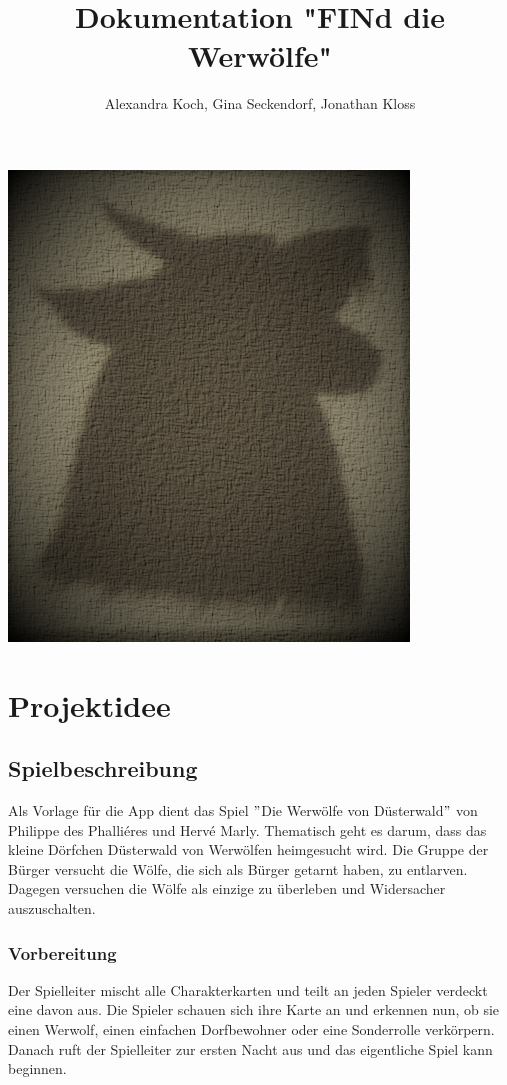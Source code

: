 \documentclass[12pt, a4paper]{article}
\title{Dokumentation "FINd die Werwölfe"}
\author{Alexandra Koch, Gina Seckendorf, Jonathan Kloss}
\begin{document}
\maketitle
\begin{center} \includegraphics{wolf} \end{center}
\newpage
\tableofcontents
\setcounter{tocdepth}{4}

\newpage
\section{Projektidee}

	\subsection{Spielbeschreibung}
Als Vorlage für die App dient das Spiel $"$Die Werwölfe von Düsterwald$"$ von Philippe des Phalliéres und Hervé Marly. Thematisch geht es darum, dass das kleine Dörfchen Düsterwald von Werwölfen heimgesucht wird. Die Gruppe der Bürger versucht die Wölfe, die sich als Bürger getarnt haben, zu entlarven. Dagegen versuchen die Wölfe als einzige zu überleben und Widersacher auszuschalten.


		\subsubsection{Vorbereitung}
Der Spielleiter mischt alle Charakterkarten und teilt an jeden Spieler verdeckt eine davon aus. Die Spieler schauen sich ihre Karte an und erkennen nun, ob sie einen Werwolf, einen einfachen Dorfbewohner oder eine Sonderrolle verkörpern. Danach ruft der Spielleiter zur ersten Nacht aus und das eigentliche Spiel kann beginnen.
\end{document}
